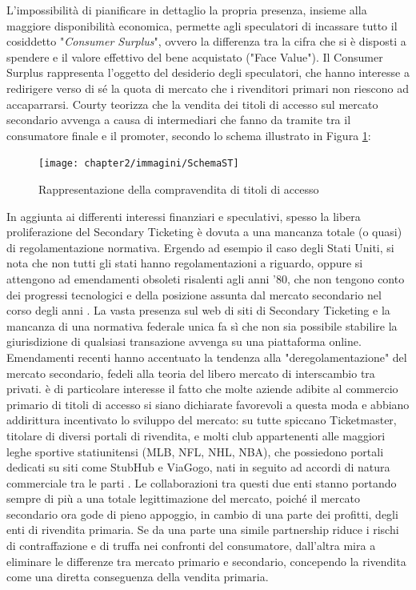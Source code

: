 L'impossibilità di pianificare in dettaglio la propria presenza, insieme alla maggiore disponibilità economica, permette agli speculatori di incassare tutto il cosiddetto "\textit{Consumer Surplus}", ovvero la differenza tra la cifra che si è disposti a spendere e il valore effettivo del bene acquistato ("Face Value"). Il Consumer Surplus rappresenta l'oggetto del desiderio degli speculatori, che hanno interesse a redirigere verso di sé la quota di mercato che i rivenditori primari non riescono ad accaparrarsi. 
Courty teorizza che la vendita dei titoli di accesso sul mercato secondario avvenga a causa di intermediari che fanno da tramite tra il consumatore finale e il promoter, secondo lo schema illustrato in Figura \ref{st}: 
\begin{figure}[htbp]
	\centering
	\texttt{[image: chapter2/immagini/SchemaST]}
	\caption{Rappresentazione della compravendita di titoli di accesso}
	\label{st}
\end{figure}
In aggiunta ai differenti interessi finanziari e speculativi, spesso la libera proliferazione del Secondary Ticketing è dovuta a una mancanza totale (o quasi) di regolamentazione normativa. Ergendo ad esempio il caso degli Stati Uniti, si nota che non tutti gli stati hanno regolamentazioni a riguardo, oppure si attengono ad emendamenti obsoleti risalenti agli anni '80, che non tengono conto dei progressi tecnologici e della posizione assunta dal mercato secondario nel corso degli anni \cite{courty2017ticket, drayer2011examining}.
La vasta presenza sul web di siti di Secondary Ticketing e la mancanza di una normativa federale unica fa sì che non sia possibile stabilire la giurisdizione di qualsiasi transazione avvenga su una piattaforma online.  
Emendamenti recenti hanno accentuato la tendenza alla "deregolamentazione" del mercato secondario, fedeli alla teoria del libero mercato di interscambio tra privati. è di particolare interesse il fatto che molte aziende adibite al commercio primario di titoli di accesso si siano dichiarate favorevoli a questa moda e abbiano addirittura incentivato lo sviluppo del mercato: su tutte spiccano Ticketmaster, titolare di diversi portali di rivendita, e molti club appartenenti alle maggiori leghe sportive statiunitensi (MLB, NFL, NHL, NBA), che possiedono portali dedicati su siti come StubHub e ViaGogo, nati in seguito ad accordi di natura commerciale tra le parti \cite{courty2014pricing}.
Le collaborazioni tra questi due enti stanno portando sempre di più a una totale legittimazione del mercato, poiché il mercato secondario ora gode di pieno appoggio, in cambio di una parte dei profitti, degli enti di rivendita primaria. Se da una parte una simile partnership riduce i rischi di contraffazione e di truffa nei confronti del consumatore, dall'altra mira a eliminare le differenze tra mercato primario e secondario, concependo la rivendita come una diretta conseguenza della vendita primaria. 

